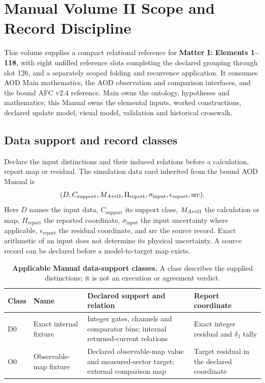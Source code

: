 \section{Manual Volume II Scope and Record Discipline}\label{manual2:scope}
This volume supplies a compact relational reference for \textbf{Matter I: Elements 1--118}, with eight unfilled reference slots completing the declared grouping through slot 126, and a separately scoped folding and recurrence application. It consumes AOD Main mathematics, the AOD observation and comparison interfaces, and the bound AFC v2.4 reference. Main owns the ontology, hypotheses and mathematics; this Manual owns the elemental inputs, worked constructions, declared update model, visual model, validation and historical crosswalk.

\subsection{Data support and record classes}\label{manual2:data-support}
Declare the input distinctions and their induced relations before a calculation,
report map or residual. The simulation data card inherited from the bound AOD
Manual is
\begin{equation}
(D,C_{\mathrm{support}},M_{A{\leftrightarrow}\Omega},\Pi_{\mathrm{report}},
\sigma_{\mathrm{input}},\epsilon_{\mathrm{report}},\mathrm{src}).
\label{eq:manual2-simulation-data-card}
\end{equation}
Here \(D\) names the input data, \(C_{\mathrm{support}}\) its support class,
\(M_{A{\leftrightarrow}\Omega}\) the calculation or map, \(\Pi_{\mathrm{report}}\) the reported
coordinate, \(\sigma_{\mathrm{input}}\) the input uncertainty where applicable,
\(\epsilon_{\mathrm{report}}\) the residual coordinate, and \(\mathrm{src}\)
the source record. Exact arithmetic of an input does not determine its physical
uncertainty. A source record can be declared before a model-to-target map exists.

\begin{table}[H]
\centering\small
\caption{\textbf{Applicable Manual data-support classes.} A class describes
the supplied distinctions; it is not an execution or agreement verdict.}
\label{tab:manual2-data-support-classes}
\begin{tabularx}{\textwidth}{@{}p{}p{}XX@{}}
\toprule
Class & Name & Declared support and relation & Report coordinate\\
\midrule
D0 & Exact internal fixture & Integer gates, channels and comparator bins;
internal returned-current relations & Exact integer residual and \(\delta_3\) tally\\
O0 & Observable-map fixture & Declared observable-map value and measured-sector
target; external comparison map & Target residual in the declared coordinate\\
\bottomrule
\end{tabularx}
\end{table}

